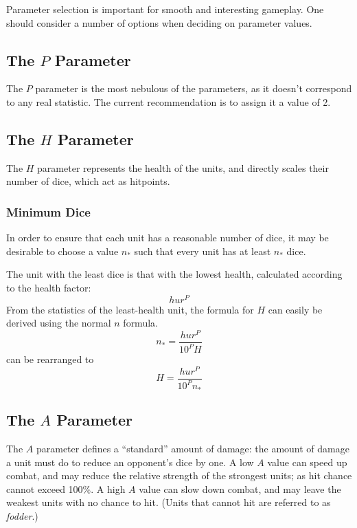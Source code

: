 \documentclass[twocolumn]{article}
\begin{document}
Parameter selection is important for smooth and interesting gameplay.
One should consider a number of options when deciding on parameter values.

\subsection{The $P$ Parameter}

The $P$ parameter is the most nebulous of the parameters,
as it doesn't correspond to any real statistic.
The current recommendation is to assign it a value of 2.

\subsection{The $H$ Parameter}

The $H$ parameter represents the health of the units,
and directly scales their number of dice, which act as hitpoints.

\subsubsection{Minimum Dice}

In order to ensure that each unit has a reasonable number of dice,
it may be desirable to choose a value $n_*$
such that every unit has at least $n_*$ dice.

The unit with the least dice is that with the lowest health,
calculated according to the health factor:
\[
    h u r^P
\]
From the statistics of the least-health unit, the formula for $H$
can easily be derived using the normal $n$ formula.
\[
    n_* =  
        \frac
            {h u r^P}
            {10^P H}
\]
can be rearranged to
\[
    H =  
        \frac
            {h u r^P}
            {10^P n_*}
\]


\subsection{The $A$ Parameter}

The $A$ parameter defines a ``standard'' amount of damage:
the amount of damage a unit must do to reduce an opponent's dice by one.
A low $A$ value can speed up combat,
and may reduce the relative strength of the strongest units;
as hit chance cannot exceed 100\%.
A high $A$ value can slow down combat,
and may leave the weakest units with no chance to hit.
(Units that cannot hit are referred to as \emph{fodder}.)
\end{document}

